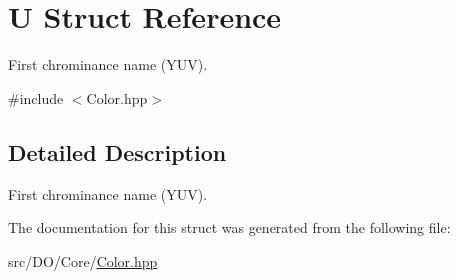 \hypertarget{struct_d_o_1_1_u}{\section{U Struct Reference}
\label{struct_d_o_1_1_u}
}


First chrominance name (Y\-U\-V).  




{\ttfamily \#include $<$Color.\-hpp$>$}



\subsection{Detailed Description}
First chrominance name (Y\-U\-V). 

The documentation for this struct was generated from the following file\-:\begin{DoxyCompactItemize}
\item 
src/\-D\-O/\-Core/\hyperlink{_color_8hpp}{Color.\-hpp}\end{DoxyCompactItemize}

